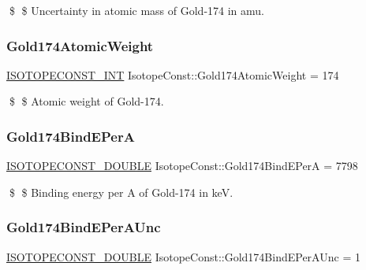 \$ \$ Uncertainty in atomic mass of Gold-\/174 in amu. \mbox{\label{group___isotope_const-_gold-_au174_ga8fef7ecbe47c6800dd0530a676a3bb7c}} 
\subsubsection{\texorpdfstring{Gold174\+Atomic\+Weight}{Gold174AtomicWeight}}
{\footnotesize\ttfamily \mbox{\hyperlink{group___isotope_const-_macros_ga5f18360b3e99483a35c32d789e62621c}{I\+S\+O\+T\+O\+P\+E\+C\+O\+N\+S\+T\+\_\+\+I\+NT}} Isotope\+Const\+::\+Gold174\+Atomic\+Weight = 174}

\$ \$ Atomic weight of Gold-\/174. \mbox{\label{group___isotope_const-_gold-_au174_ga9e940a8cd9d781015cb72e7bc87f1711}} 
\subsubsection{\texorpdfstring{Gold174\+Bind\+E\+PerA}{Gold174BindEPerA}}
{\footnotesize\ttfamily \mbox{\hyperlink{group___isotope_const-_macros_ga8f45a7272ce02c0b4c65c44636ed719a}{I\+S\+O\+T\+O\+P\+E\+C\+O\+N\+S\+T\+\_\+\+D\+O\+U\+B\+LE}} Isotope\+Const\+::\+Gold174\+Bind\+E\+PerA = 7798}

\$ \$ Binding energy per A of Gold-\/174 in keV. \mbox{\label{group___isotope_const-_gold-_au174_gaecf59367a0cdbc20b5cd8839d6553a67}} 
\subsubsection{\texorpdfstring{Gold174\+Bind\+E\+Per\+A\+Unc}{Gold174BindEPerAUnc}}
{\footnotesize\ttfamily \mbox{\hyperlink{group___isotope_const-_macros_ga8f45a7272ce02c0b4c65c44636ed719a}{I\+S\+O\+T\+O\+P\+E\+C\+O\+N\+S\+T\+\_\+\+D\+O\+U\+B\+LE}} Isotope\+Const\+::\+Gold174\+Bind\+E\+Per\+A\+Unc = 1}

